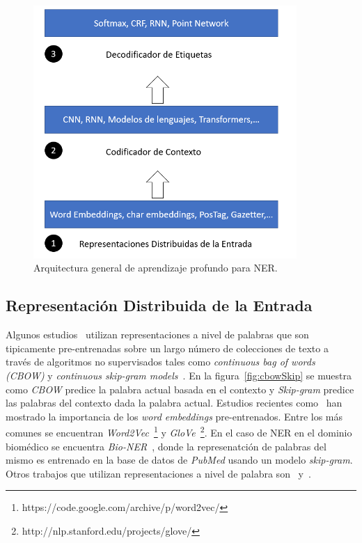 \begin{figure}[h!]
	\centering
	\includegraphics[width = 10cm]{Graphics/NERDeep.png}
	\caption{Arquitectura general de aprendizaje profundo para NER.}\label{fig:NerDeepBased}
\end{figure}

\subsection{Representaci\'on Distribuida de la Entrada}


Algunos estudios~\cite{strubell2017fast} utilizan representaciones a nivel de palabras que son tipicamente pre-entrenadas sobre un largo n\'umero de colecciones de texto a trav\'es de algoritmos no supervisados tales como \emph{continuous bag of words (CBOW)} y \emph{continuous skip-gram models}~\cite{mikolov2013efficient}. En la figura~\ref{fig:cbowSkip} se muestra como \emph{CBOW} predice la palabra actual basada en el contexto y \emph{Skip-gram} predice las palabras del contexto dada la palabra actual. Estudios recientes como~\cite{yang2018design} han mostrado la importancia de los \emph{word embeddings} pre-entrenados. Entre los m\'as comunes se encuentran \emph{Word2Vec}~\footnote{https://code.google.com/archive/p/word2vec/} y \emph{GloVe}~\footnote{http://nlp.stanford.edu/projects/glove/}. En el caso de NER en el dominio biom\'edico se encuentra \emph{Bio-NER}~\cite{yao2015biomedical}, donde la represenatci\'on de palabras del mismo es entrenado en la base de datos de \emph{PubMed} usando un modelo \emph{skip-gram}. Otros trabajos que utilizan  representaciones a nivel de palabra son~\cite{ma2016end} y~\cite{wang2018code}.

